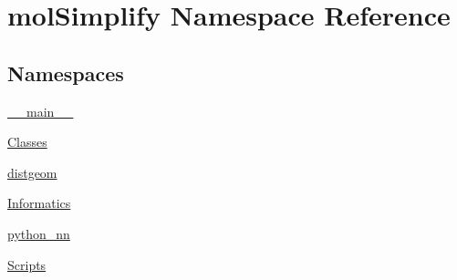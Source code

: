 \hypertarget{namespacemolSimplify}{}\section{mol\+Simplify Namespace Reference}
\label{namespacemolSimplify}
\subsection*{Namespaces}
\begin{DoxyCompactItemize}
\item 
 \hyperlink{namespacemolSimplify_1_1____main____}{\+\_\+\+\_\+main\+\_\+\+\_\+}
\item 
 \hyperlink{namespacemolSimplify_1_1Classes}{Classes}
\item 
 \hyperlink{namespacemolSimplify_1_1distgeom}{distgeom}
\item 
 \hyperlink{namespacemolSimplify_1_1Informatics}{Informatics}
\item 
 \hyperlink{namespacemolSimplify_1_1python__nn}{python\+\_\+nn}
\item 
 \hyperlink{namespacemolSimplify_1_1Scripts}{Scripts}
\end{DoxyCompactItemize}
